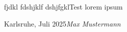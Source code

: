 \foreword

fjdkl fdshjklf dshjfgklTest
lorem ipsum

\vspace{\baselineskip}
\begin{flushright}\noindent
Karlsruhe, Juli 2025\hfill {\it Max Mustermann}\\
\end{flushright}


